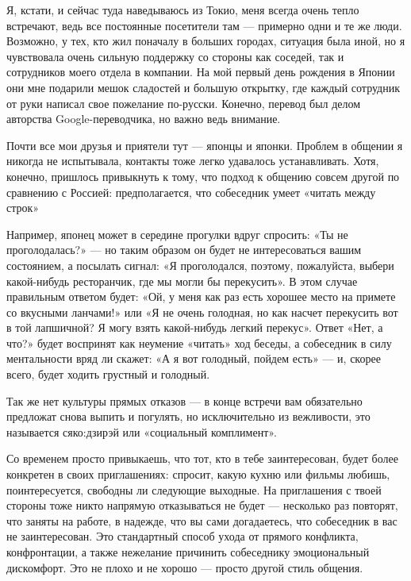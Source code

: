 Я, кстати, и сейчас туда наведываюсь из Токио, меня всегда очень тепло встречают, ведь все постоянные посетители там — примерно одни и те же люди. Возможно, у тех, кто жил поначалу в больших городах, ситуация была иной, но я чувствовала очень сильную поддержку со стороны как соседей, так и сотрудников моего отдела в компании. На мой первый день рождения в Японии они мне подарили мешок сладостей и большую открытку, где каждый сотрудник от руки написал свое пожелание по-русски. Конечно, перевод был делом авторства Google-переводчика, но важно ведь внимание.

\begin{fancyquotes}
    Почти все мои друзья и приятели тут — японцы и японки. Проблем в общении я никогда не испытывала, контакты тоже легко удавалось устанавливать. Хотя, конечно, пришлось привыкнуть к тому, что подход к общению совсем другой по сравнению с Россией: предполагается, что собеседник умеет «читать между строк»
\end{fancyquotes}

Например, японец может в середине прогулки вдруг спросить: «Ты не проголодалась?» — но таким образом он будет не интересоваться вашим состоянием, а посылать сигнал: «Я проголодался, поэтому, пожалуйста, выбери какой-нибудь ресторанчик, где мы могли бы перекусить». В этом случае правильным ответом будет: «Ой, у меня как раз есть хорошее место на примете со вкусными ланчами!» или «Я не очень голодная, но как насчет перекусить вот в той лапшичной? Я могу взять какой-нибудь легкий перекус». Ответ «Нет, а что?» будет воспринят как неумение «читать» ход беседы, а собеседник в силу ментальности вряд ли скажет: «А я вот голодный, пойдем есть» — и, скорее всего, будет ходить грустный и голодный.

Так же нет культуры прямых отказов — в конце встречи вам обязательно предложат снова выпить и погулять, но исключительно из вежливости, это называется сяко:дзирэй или «социальный комплимент».

Со временем просто привыкаешь, что тот, кто в тебе заинтересован, будет более конкретен в своих приглашениях: спросит, какую кухню или фильмы любишь, поинтересуется, свободны ли следующие выходные. На приглашения с твоей стороны тоже никто напрямую отказываться не будет — несколько раз повторят, что заняты на работе, в надежде, что вы сами догадаетесь, что собеседник в вас не заинтересован. Это стандартный способ ухода от прямого конфликта, конфронтации, а также нежелание причинить собеседнику эмоциональный дискомфорт. Это не плохо и не хорошо — просто другой стиль общения.

